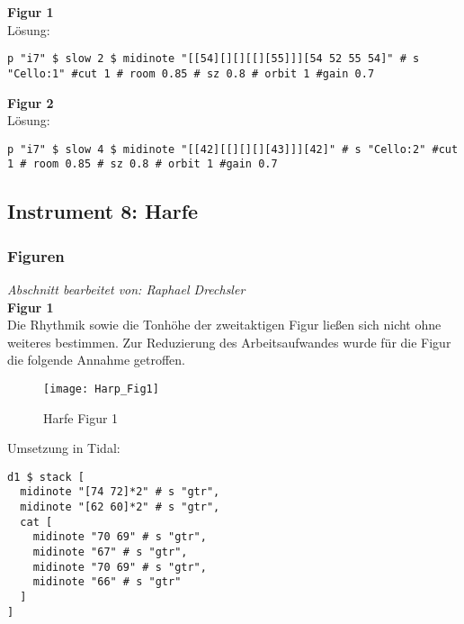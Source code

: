 \documentclass[
10pt, %
a4paper, %
oneside, %
headinclude,footinclude, %
BCOR5mm, %
]{scrartcl}
\begin{document}
\noindent\textbf{Figur 1}\\
Lösung:\\
\begin{lstlisting}
p "i7" $ slow 2 $ midinote "[[54][][][[][55]]][54 52 55 54]" # s "Cello:1" #cut 1 # room 0.85 # sz 0.8 # orbit 1 #gain 0.7
\end{lstlisting}
\noindent\textbf{Figur 2}\\
Lösung:\\
\begin{lstlisting}
p "i7" $ slow 4 $ midinote "[[42][[][][][43]]][42]" # s "Cello:2" #cut 1 # room 0.85 # sz 0.8 # orbit 1 #gain 0.7
\end{lstlisting}

\subsection{Instrument 8: Harfe}
\subsubsection{Figuren}
\textit{Abschnitt bearbeitet von: Raphael Drechsler}\\

\noindent\textbf{Figur 1}\\
Die Rhythmik sowie die Tonhöhe der zweitaktigen Figur ließen sich nicht ohne weiteres bestimmen. Zur Reduzierung des Arbeitsaufwandes wurde für die Figur die folgende Annahme getroffen. 
\begin{figure}[h]
	\centering 
	\texttt{[image: Harp\_Fig1]} 
	\caption{Harfe Figur 1}
\end{figure}

\noindent Umsetzung in Tidal:
\begin{lstlisting}
d1 $ stack [
  midinote "[74 72]*2" # s "gtr",
  midinote "[62 60]*2" # s "gtr",
  cat [
    midinote "70 69" # s "gtr",
    midinote "67" # s "gtr",
    midinote "70 69" # s "gtr",
    midinote "66" # s "gtr"
  ]
] 
\end{lstlisting}
\end{document}
